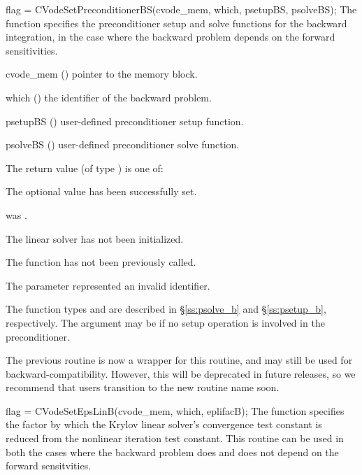 {
  flag = CVodeSetPreconditionerBS(cvode\_mem, which, psetupBS, psolveBS);
}
{
  The function  specifies the preconditioner
  setup and solve functions for the backward integration, in the case
  where the backward problem depends on the forward sensitivities.
}
{
  \begin{args}[psetupBS]
  \item[cvode\_mem] ()
    pointer to the {\cvodes} memory block.
  \item[which] ()
    the identifier of the backward problem.
  \item[psetupBS] ()
    user-defined preconditioner setup function.
  \item[psolveBS] ()
    user-defined preconditioner solve function.
  \end{args}
}
{
  The return value  (of type ) is one of:
  \begin{args}
  \item[\Id{CVLS\_SUCCESS}]
    The optional value has been successfully set.
  \item[\Id{CVLS\_MEM\_NULL}]
     was .
  \item[\Id{CVLS\_LMEM\_NULL}]
    The {\cvls} linear solver has not been initialized.
  \item[\Id{CVLS\_NO\_ADJ}]
    The function  has not been previously called.
  \item[\Id{CVLS\_ILL\_INPUT}]
    The parameter  represented an invalid identifier.
  \end{args}
}
{
  The function types  and  are
  described in \S\ref{ss:psolve_b} and \S\ref{ss:psetup_b}, respectively.
  The  argument may be  if no setup operation is involved
  in the preconditioner.

  The previous routine  is now a wrapper for this
  routine, and may still be used for backward-compatibility.  However,
  this will be deprecated in future releases, so we recommend that
  users transition to the new routine name soon.
}
{
  flag = CVodeSetEpsLinB(cvode\_mem, which, eplifacB);
}
{
  The function  specifies the factor by
  which the Krylov linear solver's convergence test constant is reduced
  from the nonlinear iteration test constant.
  This routine can be used in both the cases where the backward problem
  does and does not depend on the forward sensitvities.
}
